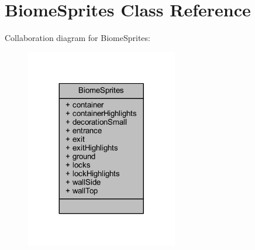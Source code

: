 \hypertarget{class_biome_sprites}{}\section{Biome\+Sprites Class Reference}
\label{class_biome_sprites}


Collaboration diagram for Biome\+Sprites\+:
\nopagebreak
\begin{figure}[H]
\begin{center}
\leavevmode
\includegraphics[width=188pt]{class_biome_sprites__coll__graph}
\end{center}
\end{figure}

